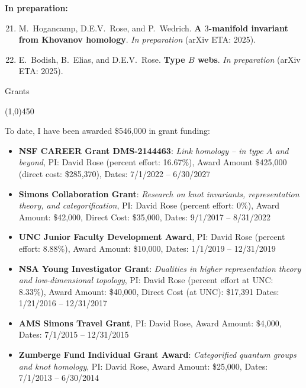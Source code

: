 \documentclass[10pt]{article}
\begin{document}
\noindent\textbf{In preparation:}

\begin{enumerate}
\setcounter{enumi}{20}



\item
M.~Hogancamp, D.E.V.~Rose, and P.~Wedrich.
{\bf A $3$-manifold invariant from Khovanov homology}.
\emph{In preparation} (arXiv ETA: 2025).

\item 
E.~Bodish, B.~Elias, and D.E.V.~Rose.
{\bf Type $B$ webs}.
\emph{In preparation} (arXiv ETA: 2025).


\end{enumerate}


\newpage
\noindent
{\large \sc Grants}

\vspace{-0.1in}
\noindent
\line(1,0){450}

\smallskip

\noindent To date, I have been awarded \$546,000 in grant funding:

\begin{itemize}
\item {\bf NSF CAREER Grant DMS-2144463}: 
\emph{Link homology -- in type $A$ and beyond},
PI: David Rose (percent effort: 16.67\%),
Award Amount \$425,000 (direct cost: \$285,370),
Dates: 7/1/2022 -- 6/30/2027

\item {\bf Simons Collaboration Grant}: 
\emph{Research on knot invariants, representation theory, and categorification}, 
PI: David Rose (percent effort: 0\%), 
Award Amount: \$42,000, 
Direct Cost: \$35,000,
Dates: 9/1/2017 -- 8/31/2022

\item {\bf UNC Junior Faculty Development Award},
PI: David Rose (percent effort: 8.88\%), 
Award Amount: \$10,000, 
Dates: 1/1/2019 -- 12/31/2019

\item {\bf NSA Young Investigator Grant}: 
\emph{ Dualities in higher representation theory and low-dimensional topology}, 
PI: David Rose (percent effort at UNC: 8.33\%), 
Award Amount: \$40,000, 
Direct Cost (at UNC): \$17,391
Dates: 1/21/2016 -- 12/31/2017

\item {\bf AMS Simons Travel Grant}, 
PI: David Rose,
Award Amount: \$4,000, 
Dates: 7/1/2015 -- 12/31/2015

 \item {\bf Zumberge Fund Individual Grant Award}: \emph{ Categorified quantum groups and knot homology}, 
 PI: David Rose,
 Award Amount: \$25,000, 
 Dates: 7/1/2013 -- 6/30/2014
\end{itemize}
\end{document}
